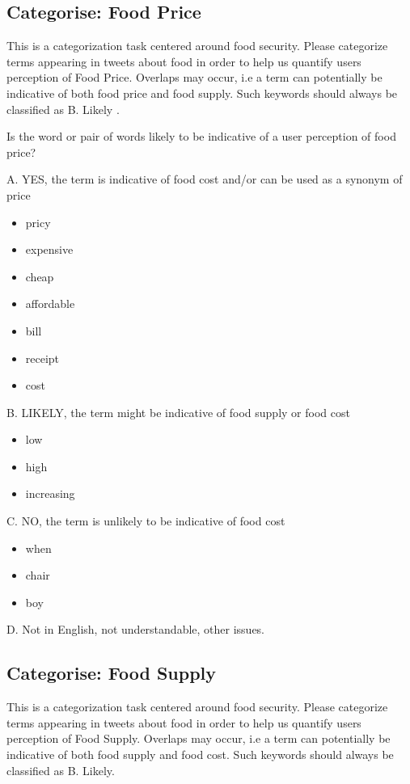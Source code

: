 \subsection{Categorise: Food Price}

This is a categorization task centered around food security. Please categorize terms appearing in tweets about food in order to help us quantify users perception of Food Price. Overlaps may occur, i.e a term can potentially be indicative of both food price and food supply. Such keywords should always be classified as B. Likely .

Is the word or pair of words likely to be indicative of a user perception of food price?

A. YES, the term is indicative of food cost and/or can be used as a synonym of price

\begin{itemize}

  \item pricy 
  \item expensive 
  \item cheap 
  \item affordable 
  \item bill 
  \item receipt 
  \item cost 
\end{itemize}


B. LIKELY, the term might be indicative of food supply or food cost
\begin{itemize}
  \item low
  \item high 
  \item increasing 
\end{itemize}


C. NO, the term is unlikely to be indicative of food cost 
\begin{itemize}
  \item when
  \item chair
  \item boy
\end{itemize}


D. Not in English, not understandable, other issues.


\subsection{Categorise: Food Supply}

This is a categorization task centered around food security. Please categorize terms appearing in tweets about food in order to help us quantify users perception of Food Supply. Overlaps may occur, i.e a term can potentially be indicative of both food supply and food cost. Such keywords should always be classified as B. Likely.

